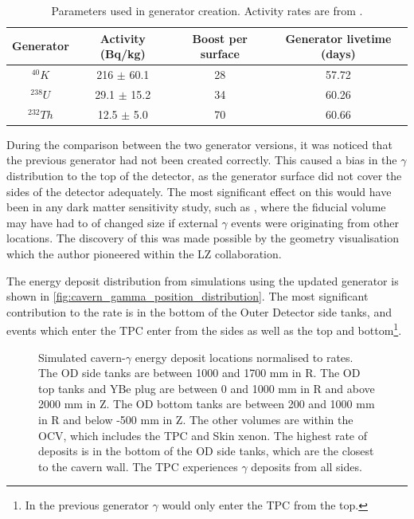 \begin{table}
    \centering
    \begin{tabular}{c|c|c|c}
        Generator    & Activity (Bq/kg)   & Boost per surface & Generator livetime (days)  \\ \hline
        ${}^{40}K$   & 216 $\pm$ 60.1     & 28                & 57.72                      \\
        ${}^{238}U$  & 29.1 $\pm$ 15.2    & 34                & 60.26                      \\
        ${}^{232}Th$ & 12.5 $\pm$ 5.0     & 70                & 60.66
    \end{tabular}
    \caption{Parameters used in generator creation. Activity rates are from \cite{LZ_Gamma_Ray_Background_ref}.}
    \label{tab:cavern_gamma_generator_parameters}
\end{table}





\par
During the comparison between the two generator versions, it was noticed that the previous generator had not been created correctly.
This caused a bias in the $\gamma$ distribution to the top of the detector, as the generator surface did not cover the sides of the detector adequately.
The most significant effect on this would have been in any dark matter sensitivity study, such as \cite{lz_simulations_ref}, where the fiducial volume may have had to of changed size if external $\gamma$ events were originating from other locations.
The discovery of this was made possible by the geometry visualisation which the author pioneered within the LZ collaboration.

\par
The energy deposit distribution from simulations using the updated generator is shown in \autoref{fig:cavern_gamma_position_distribution}.
The most significant contribution to the rate is in the bottom of the Outer Detector side tanks, and events which enter the TPC enter from the sides as well as the top and bottom\footnote{In the previous generator $\gamma$ would only enter the TPC from the top.}.

\begin{figure}
    \centering
    \resizebox{\textwidth}{!}{

}
    \caption[Simulated cavern-$\gamma$ energy deposit locations normalised to rates.]{Simulated cavern-$\gamma$ energy deposit locations normalised to rates.
             The OD side tanks are between 1000 and 1700 mm in R.
             The OD top tanks and YBe plug are between 0 and 1000 mm in R and above 2000 mm in Z.
             The OD bottom tanks are between 200 and 1000 mm in R and below -500 mm in Z.
             The other volumes are within the OCV, which includes the TPC and Skin xenon.
             The highest rate of deposits is in the bottom of the OD side tanks, which are the closest to the cavern wall.
             The TPC experiences $\gamma$ deposits from all sides.}
    \label{fig:cavern_gamma_position_distribution}
\end{figure}